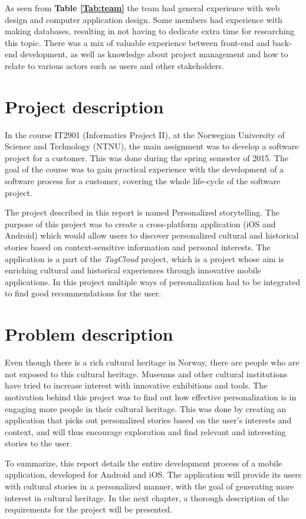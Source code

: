 As seen from \textbf{Table \ref{Tab:team}} the team had general experience with web design and computer application design. Some members had experience with making databases, resulting in not having to dedicate extra time for researching this topic. There was a mix of valuable experience between front-end and back-end development, as well as knowledge about project management and how to relate to various actors such as users and other stakeholders.

\section{Project description}

In the course IT2901 \cite{es20} (Informatics Project II), at the Norwegian University of Science and Technology (NTNU), the main assignment was to develop a software project for a customer. This was done during the spring semester of 2015. The goal of the course was to gain practical experience with the development of a software process for a customer, covering the whole life-cycle of the software project.\newline

The project described in this report is named Personalized storytelling. The purpose of this project was to create a cross-platform application (iOS and Android) which would allow users to discover personalized cultural and historical stories based on context-sensitive information and personal interests. The application is a part of the \textit{TagCloud} \cite{es21} project, which is a project whose aim is enriching cultural and historical experiences through innovative mobile applications.
In this project multiple ways of personalization had to be integrated to find good recommendations for the user.

\section{Problem description}

Even though there is a rich cultural heritage in Norway, there are people who are not exposed to this cultural heritage. Museums and other cultural institutions have tried to increase interest with innovative exhibitions and tools. The motivation behind this project was to find out how effective personalization is in engaging more people in their cultural heritage. This was done by creating an application that picks out personalized stories based on the user's interests and context, and will thus encourage exploration and find relevant and interesting stories to the user. \newline

To summarize, this report details the entire development process of a mobile application, developed for Android and iOS. The application will provide its users with cultural stories in a personalized manner, with the goal of generating more interest in cultural heritage. In the next chapter, a thorough description of the requirements for the project will be presented.

\cleardoublepage